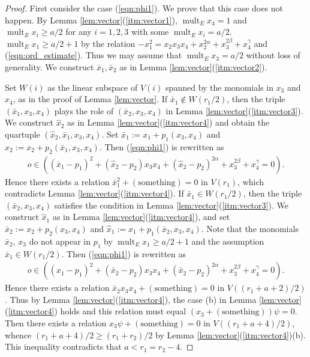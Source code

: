 \documentclass[a4paper,11pt]{amsart}
\theoremstyle{definition}
\theoremstyle{remark}
\numberwithin{equation}{section}
\newcommand{\mult}{\operatorname{mult}}
\newcommand{\something}{\mathrm{something}}
\begin{document}
\begin{proof}
First consider the case (\ref{eqn:phi1}).
We prove that this case does not happen.
By Lemma \ref{lem:vector}(\ref{itm:vector1}),
$\mult_E x_4=1$ and $\mult_E x_i\ge a/2$ for any $i=1,2,3$
with some $\mult_E x_i=a/2$.
$\mult_E x_1 \ge a/2+1$
by the relation $-x_1^2=x_2x_3x_4+x_2^{2\alpha}+x_3^{2\beta}+x_4^\gamma$
and (\ref{eqn:ord_estimate}).
Thus we may assume that $\mult_E x_3=a/2$ without loss of generality.
We construct $\bar{x}_1, \bar{x}_2$
as in Lemma \ref{lem:vector}(\ref{itm:vector2}).

Set $W(i)$ as the linear subspace of $V(i)$ spanned by the monomials
in $x_3$ and $x_4$,
as in the proof of Lemma \ref{lem:vector}.
If $\bar{x}_1 \not\in W(r_1/2)$,
then the triple $(\bar{x}_1,x_3,x_4)$ plays the role
of $(\bar{x}_2,x_3,x_4)$ in Lemma \ref{lem:vector}(\ref{itm:vector3}).
We construct $\hat{x}_2$ as in Lemma \ref{lem:vector}(\ref{itm:vector4})
and obtain the quartuple $(\hat{x}_2,\bar{x}_1,x_3,x_4)$.
Set $\bar{x}_1:=x_1+p_1(x_3,x_4)$
and $\hat{x}_2:=x_2+p_2(\bar{x}_1,x_3,x_4)$.
Then (\ref{eqn:phi1}) is rewritten as
\begin{align*}
o \in ((\bar{x}_1-p_1)^2+(\hat{x}_2-p_2)x_3x_4+
(\hat{x}_2-p_2)^{2\alpha}+x_3^{2\beta}+x_4^\gamma=0).
\end{align*}
Hence there exists a relation $\bar{x}_1^2+(\something)=0$ in $V(r_1)$,
which contradicts Lemma \ref{lem:vector}(\ref{itm:vector4}).
If $\bar{x}_1 \in W(r_1/2)$,
then the triple $(\bar{x}_2,x_3,x_4)$ satisfies the condition
in Lemma \ref{lem:vector}(\ref{itm:vector3}).
We construct $\hat{x}_1$ as in Lemma \ref{lem:vector}(\ref{itm:vector4}),
and set $\bar{x}_2:=x_2+p_2(x_3,x_4)$
and $\hat{x}_1:=x_1+p_1(\bar{x}_2,x_3,x_4)$.
Note that the monomials $\bar{x}_2$, $x_3$ do not appear in $p_1$
by $\mult_E x_1 \ge a/2+1$ and the assumption $\bar{x}_1 \in W(r_1/2)$.
Then (\ref{eqn:phi1}) is rewritten as
\begin{align*}
o \in ((\hat{x}_1-p_1)^2+(\bar{x}_2-p_2)x_3x_4+
(\bar{x}_2-p_2)^{2\alpha}+x_3^{2\beta}+x_4^\gamma=0).
\end{align*}
Hence there exists a relation $\bar{x}_2x_3x_4+(\something)=0$
in $V((r_1+a+2)/2)$.
Thus by Lemma \ref{lem:vector}(\ref{itm:vector4}),
the case (b) in Lemma \ref{lem:vector}(\ref{itm:vector4}) holds
and this relation must equal $(x_3+(\something))\psi=0$.
Then there exists a relation $x_3\psi+(\something)=0$
in $V((r_1+a+4)/2)$,
whence $(r_1+a+4)/2 \ge (r_1+r_2)/2$
by Lemma \ref{lem:vector}(\ref{itm:vector4})(b).
This inequality contradicts that $a<r_1=r_2-4$.


\end{proof}
\end{document}
